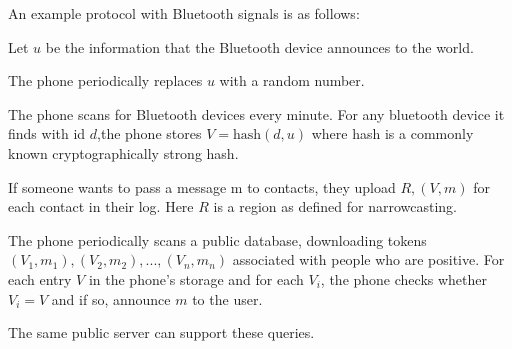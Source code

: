 \documentclass{article}
\begin{document}
An example protocol with Bluetooth signals is as follows:

Let $u$ be the information that the Bluetooth device announces to the world.

The phone periodically replaces $u$ with a random number.

The phone scans for Bluetooth devices every minute.  For any bluetooth device it finds with id $d$,the phone stores $V = \mbox{hash}(d,u)$ where hash is a commonly known cryptographically strong hash.

If someone wants to pass a message m to contacts, they upload $R,(V,m)$ for each contact in their log.  Here $R$ is a region as defined for narrowcasting.

The phone periodically scans a public database, downloading tokens $(V_1,m_1), (V_2,m_2),..., (V_n, m_n)$ associated with people who are positive.  For each entry $V$ in the phone’s storage and for each $V_i$, the phone checks whether $V_i=V$ and if so, announce $m$ to the user.

The same public server can support these queries. 
\end{document}

